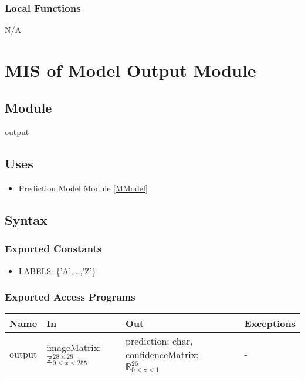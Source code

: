 \documentclass[12pt, titlepage]{article}
\begin{document}
\subsubsection{Local Functions}

N/A

\section{MIS of Model Output Module} \label{MOutput}

\subsection{Module}

output
\subsection{Uses}

\begin{itemize}
  \item Prediction Model Module \ref{MModel}
\end{itemize}


\subsection{Syntax}

\subsubsection{Exported Constants}

\begin{itemize}
  \item LABELS: \{'A',...,'Z'\}
\end{itemize}

\subsubsection{Exported Access Programs}

\begin{center}
\begin{tabular}{p{2cm} p{4cm} p{4cm} p{2cm}}
\hline
\textbf{Name} & \textbf{In} & \textbf{Out} & \textbf{Exceptions} \\
\hline
output & imageMatrix: $\mathbb{Z}^{28 \times 28}_{0 \le x \le 255}$ & prediction: char, confidenceMatrix: $\mathbb{R}_{\text{0} \leq \text{x} \leq \text{1}}^{26}$ & - \\
\hline
\end{tabular}
\end{center}
\end{document}
